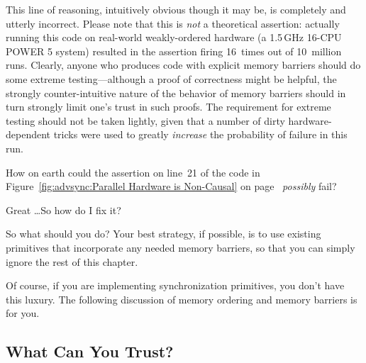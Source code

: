 This line of reasoning, intuitively obvious though it may be, is completely
and utterly incorrect.
Please note that this is \emph{not} a theoretical assertion:
actually running this code on real-world weakly-ordered hardware
(a 1.5\,GHz 16-CPU POWER 5 system) resulted in the assertion firing
16~times out of 10~million runs.
Clearly, anyone who produces code with explicit memory barriers
should do some extreme testing---although a proof of correctness might
be helpful, the strongly counter-intuitive nature of the behavior of
memory barriers should in turn strongly limit one's trust in such proofs.
The requirement for extreme testing should not be taken lightly, given
that a number of dirty hardware-dependent tricks were used to
greatly \emph{increase} the probability of failure in this run.

\QuickQuiz{}
	How on earth could the assertion on line~21 of the code in
	Figure~\ref{fig:advsync:Parallel Hardware is Non-Causal} on
	page~\pageref{fig:advsync:Parallel Hardware is Non-Causal}
	\emph{possibly} fail?
 \QuickQuizEnd

\QuickQuiz{}
	Great \ldots So how do I fix it?
 \QuickQuizEnd

So what should you do?
Your best strategy, if possible, is to use existing primitives that
incorporate any needed memory barriers, so that you can simply ignore
the rest of this chapter.

Of course, if you are implementing synchronization primitives,
you don't have this luxury.
The following discussion of memory ordering and memory barriers
is for you.

\subsection{What Can You Trust?}
\label{sec:advsync:What Can You Trust?}

